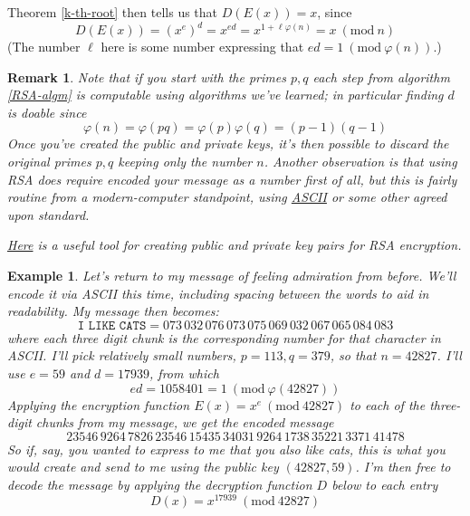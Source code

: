 \documentclass[12pt]{article}
\numberwithin{equation}{subsection}
\theoremstyle{note}
\newtheorem{example}[subsection]{Example}
\newtheorem{remark}[subsection]{Remark}
\newcommand{\Mod}[1]{\ (\mathrm{mod}\ #1)}
\begin{document}
Theorem \ref{k-th-root} then tells us that $D(E(x))=x$, since \[D(E(x))=(x^e)^d=x^{ed}=x^{1+\ell \varphi(n)}=x\Mod{n}\] (The number $\ell$ here is some number expressing that $ed=1\Mod{\varphi(n)}$.) 

\begin{remark}Note that if you start with the primes $p,q$ each step from algorithm \ref{RSA-algm} is computable using algorithms we've learned; in particular finding $d$ is doable since \[\varphi(n)=\varphi(pq)=\varphi(p)\varphi(q)=(p-1)(q-1)\] Once you've created the public and private keys, it's then possible to discard the original primes $p,q$ keeping only the number $n$. Another observation is that using RSA does require encoded your message as a \textit{number} first of all, but this is fairly routine from a modern-computer standpoint, using \href{https://www.cs.drexel.edu/~popyack/Courses/CSP/Fa17/notes/10.1_Cryptography/ASCII.html}{ASCII} or some other agreed upon standard. 

\href{https://www.cs.drexel.edu/~popyack/Courses/CSP/Fa17/notes/10.1_Cryptography/RSAWorksheetv4e.html}{Here} is a useful tool for creating public and private key pairs for RSA encryption. \end{remark}

\begin{example} \label{RSA-example}
Let's return to my message of feeling admiration from before. We'll encode it via ASCII this time, including spacing between the words to aid in readability. My message then becomes: \[ \texttt{I LIKE CATS} = 073\, 032\, 076\, 073\, 075\, 069\, 032\, 067\, 065\, 084\, 083 \] where each three digit chunk is the corresponding number for that character in ASCII. I'll pick relatively small numbers, $p=113, q=379$, so that $n=42827$. I'll use $e=59$ and $d=17939$, from which \[ed=1058401=1\Mod{\varphi(42827)}\]
Applying the encryption function $E(x)=x^e\Mod{42827}$ to each of the three-digit chunks from my message, we get the encoded message \[ 23546\, 9264\, 7826\, 23546\, 15435\, 34031\, 9264\, 1738 \,35221\, 3371\, 41478  \]
So if, say, you wanted to express to me that you also like cats, this is what you would create and send to me using the public key $(42827,59)$. I'm then free to decode the message by applying the decryption function $D$ below to each entry \[ D(x)=x^{17939} \Mod{42827}\] 
\end{example}
\end{document}

